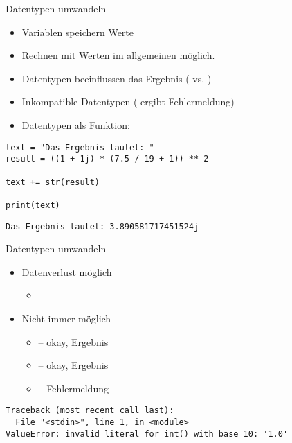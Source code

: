 \begin{frame}[fragile]{Datentypen umwandeln}
%
\begin{itemize}
\item Variablen speichern Werte
\item Rechnen mit Werten im allgemeinen möglich.
\item Datentypen beeinflussen das Ergebnis ( vs. )
\item Inkompatible Datentypen ( ergibt Fehlermeldung)
\item Datentypen als Funktion:  \thus~ 
\end{itemize}
%
\begin{minipage}[t]{.52\linewidth}
\phantom{x}
\begin{codebox}
\begin{verbatim}
text = "Das Ergebnis lautet: "
result = ((1 + 1j) * (7.5 / 19 + 1)) ** 2

text += str(result)

print(text)
\end{verbatim}
\end{codebox}
\end{minipage}
%
\begin{minipage}[t]{.47\linewidth}
\phantom{x}
\begin{cmdbox}
\begin{verbatim}
Das Ergebnis lautet: 3.890581717451524j
\end{verbatim}
\end{cmdbox}
\end{minipage}
%
\end{frame}


\begin{frame}[fragile]{Datentypen umwandeln}
%
\begin{itemize}
\item Datenverlust möglich
	\begin{itemize}
	\item {} \thus~ 
	\end{itemize}
\item Nicht immer möglich
	\begin{itemize}
	\item {} -- okay, Ergebnis 
	\item {} -- okay, Ergebnis 
	\item  {} -- Fehlermeldung
	\end{itemize}
\end{itemize}
%
\begin{cmdbox}
\begin{verbatim}
Traceback (most recent call last):
  File "<stdin>", line 1, in <module>
ValueError: invalid literal for int() with base 10: '1.0'
\end{verbatim}
\end{cmdbox}
%
\end{frame}

